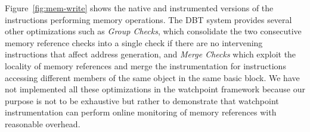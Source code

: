 Figure~\ref{fig:mem-write} shows the native and instrumented versions of the instructions performing memory operations. The DBT system provides several other optimizations such as \emph{Group Checks}, which consolidate the two consecutive memory reference checks into a single check if there are no intervening instructions that affect address generation, and \emph{Merge Checks} which exploit the locality of memory references and merge the instrumentation for instructions accessing different members of the same object in the same basic block. We have not implemented all these optimizations in the watchpoint framework because our purpose is not to be exhaustive but rather to demonstrate that watchpoint instrumentation can perform online monitoring of memory references with reasonable overhead.



